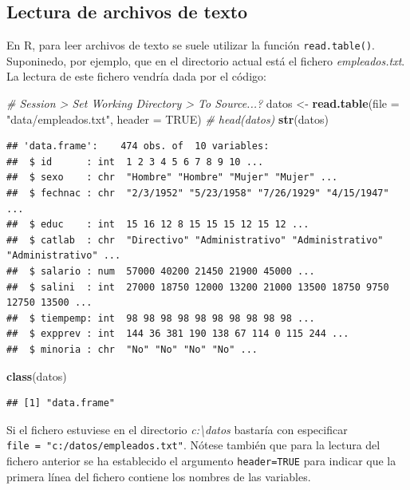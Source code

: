 \documentclass[
]{book}
\newenvironment{Shaded}{\begin{snugshade}}{\end{snugshade}}
\newcommand{\AttributeTok}[1]{\textcolor[rgb]{0.13,0.29,0.53}{#1}}
\newcommand{\CommentTok}[1]{\textcolor[rgb]{0.56,0.35,0.01}{\textit{#1}}}
\newcommand{\ConstantTok}[1]{\textcolor[rgb]{0.56,0.35,0.01}{#1}}
\newcommand{\FunctionTok}[1]{\textcolor[rgb]{0.13,0.29,0.53}{\textbf{#1}}}
\newcommand{\NormalTok}[1]{#1}
\newcommand{\OtherTok}[1]{\textcolor[rgb]{0.56,0.35,0.01}{#1}}
\newcommand{\StringTok}[1]{\textcolor[rgb]{0.31,0.60,0.02}{#1}}
\begin{document}
\hypertarget{cap2-texto}{%
\subsection{Lectura de archivos de texto}\label{cap2-texto}}

En R, para leer archivos de texto se suele utilizar la función \texttt{read.table()}.
Suponinedo, por ejemplo, que en el directorio actual está el fichero
\emph{empleados.txt}. La lectura de este fichero vendría dada por el código:

\begin{Shaded}
\begin{Highlighting}[]
\CommentTok{\# Session \textgreater{} Set Working Directory \textgreater{} To Source...?}
\NormalTok{datos }\OtherTok{\textless{}{-}} \FunctionTok{read.table}\NormalTok{(}\AttributeTok{file =} \StringTok{"data/empleados.txt"}\NormalTok{, }\AttributeTok{header =} \ConstantTok{TRUE}\NormalTok{)}
\CommentTok{\# head(datos)}
\FunctionTok{str}\NormalTok{(datos)}
\end{Highlighting}
\end{Shaded}

\begin{verbatim}
## 'data.frame':    474 obs. of  10 variables:
##  $ id      : int  1 2 3 4 5 6 7 8 9 10 ...
##  $ sexo    : chr  "Hombre" "Hombre" "Mujer" "Mujer" ...
##  $ fechnac : chr  "2/3/1952" "5/23/1958" "7/26/1929" "4/15/1947" ...
##  $ educ    : int  15 16 12 8 15 15 15 12 15 12 ...
##  $ catlab  : chr  "Directivo" "Administrativo" "Administrativo" "Administrativo" ...
##  $ salario : num  57000 40200 21450 21900 45000 ...
##  $ salini  : int  27000 18750 12000 13200 21000 13500 18750 9750 12750 13500 ...
##  $ tiempemp: int  98 98 98 98 98 98 98 98 98 98 ...
##  $ expprev : int  144 36 381 190 138 67 114 0 115 244 ...
##  $ minoria : chr  "No" "No" "No" "No" ...
\end{verbatim}

\begin{Shaded}
\begin{Highlighting}[]
\FunctionTok{class}\NormalTok{(datos)}
\end{Highlighting}
\end{Shaded}

\begin{verbatim}
## [1] "data.frame"
\end{verbatim}

Si el fichero estuviese en el directorio \emph{c:\textbackslash datos} bastaría con especificar
\texttt{file\ =\ "c:/datos/empleados.txt"}.
Nótese también que para la lectura del fichero anterior se ha
establecido el argumento \texttt{header=TRUE} para indicar que la primera línea del
fichero contiene los nombres de las variables.
\end{document}
